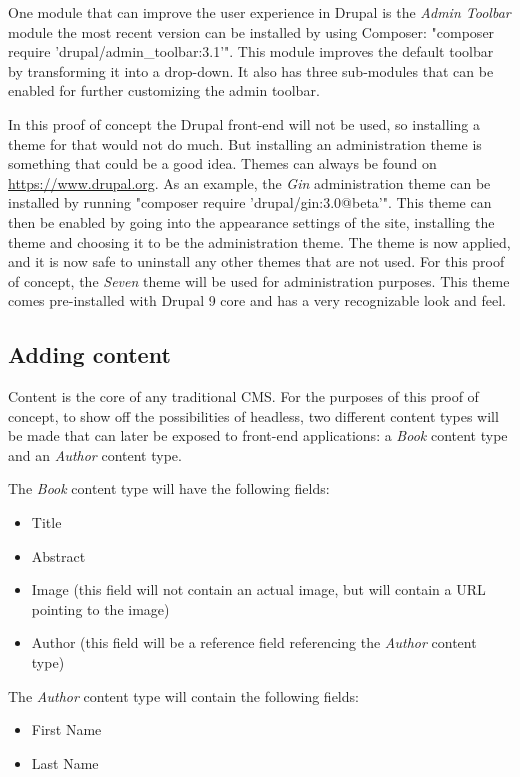 One module that can improve the user experience in Drupal is the \emph{Admin Toolbar}
module the most recent version can be installed by using Composer: "composer require 'drupal/admin\_toolbar:3.1'". This module improves the default toolbar by transforming it into a  drop-down. It also has three sub-modules that can be enabled for further customizing the admin toolbar.

In this proof of concept the Drupal front-end will not be used, so installing a theme for that would not do much. But installing an administration theme is something that could be a good idea. Themes can always be found on \url{https://www.drupal.org}. As an example, the \emph{Gin} administration theme can be installed by running "composer require 'drupal/gin:3.0@beta'". This theme can then be enabled by going into the appearance settings of the site, installing the theme and choosing it to be the administration theme. The theme is now applied, and it is now safe to uninstall any other themes that are not used. For this proof of concept, the \emph{Seven} theme will be used for administration purposes. This theme comes pre-installed with Drupal 9 core and has a very recognizable look and feel.

\subsection{Adding content}

Content is the core of any traditional CMS. For the purposes of this proof of concept, to show off the possibilities of headless, two different content types will be made that can later be exposed to front-end applications: a \emph{Book} content type and an \emph{Author} content type.

The \emph{Book} content type will have the following fields: 

\begin{itemize}
	\item Title
	\item Abstract
	\item Image (this field will not contain an actual image, but will contain a URL pointing to the image)
	\item Author (this field will be a reference field referencing the \emph{Author} content type)
\end{itemize}

The \emph{Author} content type will contain the following fields:

\begin{itemize}
	\item First Name
	\item Last Name
\end{itemize}

